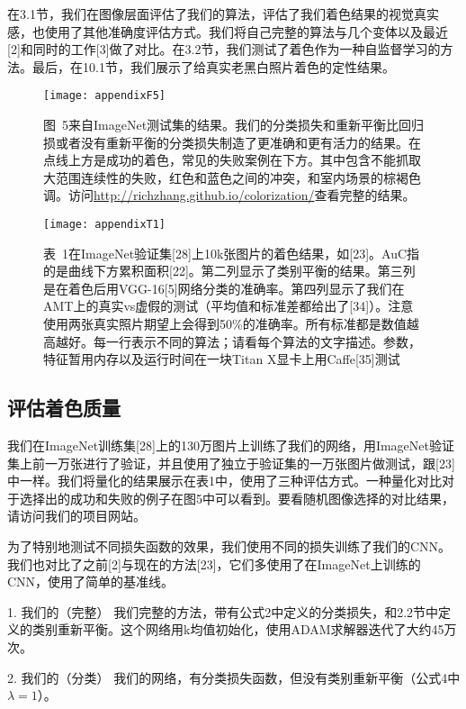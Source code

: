 在3.1节，我们在图像层面评估了我们的算法，评估了我们着色结果的视觉真实感，也使用了其他准确度评估方式。我们将自己完整的算法与几个变体以及最近[2]和同时的工作[3]做了对比。在3.2节，我们测试了着色作为一种自监督学习的方法。最后，在10.1节，我们展示了给真实老黑白照片着色的定性结果。

\begin{figure}[!htb]
  \centering
  \texttt{[image: appendixF5]}
  \caption*{图~5\quad 来自ImageNet测试集的结果。我们的分类损失和重新平衡比回归损或者没有重新平衡的分类损失制造了更准确和更有活力的结果。在点线上方是成功的着色，常见的失败案例在下方。其中包含不能抓取大范围连续性的失败，红色和蓝色之间的冲突，和室内场景的棕褐色调。访问\url{http://richzhang.github.io/colorization/}查看完整的结果。}
  \label{tab:badfigure5}
\end{figure}

\begin{figure}[h]
  \centering
  \texttt{[image: appendixT1]}
  \caption*{表~1\quad 在ImageNet验证集[28]上10k张图片的着色结果，如[23]。AuC指的是曲线下方累积面积[22]。第二列显示了类别平衡的结果。第三列是在着色后用VGG-16[5]网络分类的准确率。第四列显示了我们在AMT上的真实vs虚假的测试（平均值和标准差都给出了[34]）。注意使用两张真实照片期望上会得到50\%的准确率。所有标准都是数值越高越好。每一行表示不同的算法；请看每个算法的文字描述。参数，特征暂用内存以及运行时间在一块Titan X显卡上用Caffe[35]测试}
  \label{tab:badfigure6}
\end{figure}

\subsection{评估着色质量}

我们在ImageNet训练集[28]上的130万图片上训练了我们的网络，用ImageNet验证集上前一万张进行了验证，并且使用了独立于验证集的一万张图片做测试，跟[23]中一样。我们将量化的结果展示在表1中，使用了三种评估方式。一种量化对比对于选择出的成功和失败的例子在图5中可以看到。要看随机图像选择的对比结果，请访问我们的项目网站。


为了特别地测试不同损失函数的效果，我们使用不同的损失训练了我们的CNN。我们也对比了之前[2]与现在的方法[23]，它们多使用了在ImageNet上训练的CNN，使用了简单的基准线。

1. {\heiti 我们的（完整）} 我们完整的方法，带有公式2中定义的分类损失，和2.2节中定义的类别重新平衡。这个网络用k均值初始化，使用ADAM求解器迭代了大约45万次。

2. {\heiti 我们的（分类）} 我们的网络，有分类损失函数，但没有类别重新平衡（公式4中$\lambda = 1$）。

